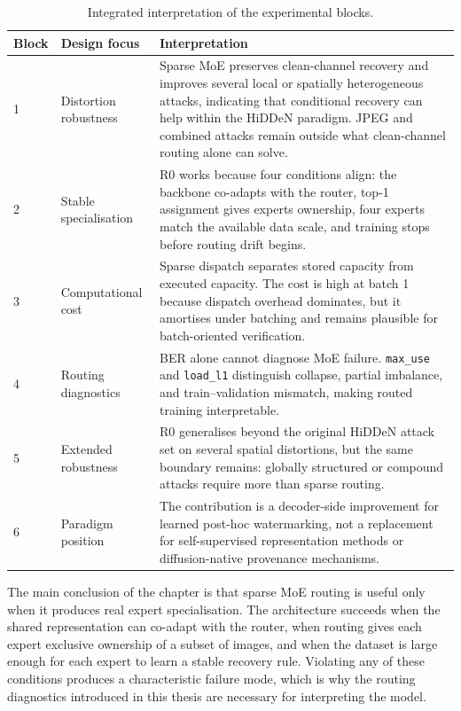 ﻿\documentclass[12pt, a4paper, twoside]{report}
\numberwithin{equation}{chapter}
\begin{document}
\begin{table}[H]
\centering
\begin{tabular}{p{0.6cm}p{3.5cm}p{8cm}}
\toprule
\textbf{Block} & \textbf{Design focus} & \textbf{Interpretation} \\
\midrule
1 & Distortion robustness & Sparse MoE preserves clean-channel recovery and improves several local or spatially heterogeneous attacks, indicating that conditional recovery can help within the HiDDeN paradigm. JPEG and combined attacks remain outside what clean-channel routing alone can solve. \\
2 & Stable specialisation & R0 works because four conditions align: the backbone co-adapts with the router, top-1 assignment gives experts ownership, four experts match the available data scale, and training stops before routing drift begins. \\
3 & Computational cost & Sparse dispatch separates stored capacity from executed capacity. The cost is high at batch 1 because dispatch overhead dominates, but it amortises under batching and remains plausible for batch-oriented verification. \\
4 & Routing diagnostics & BER alone cannot diagnose MoE failure. \texttt{max\_use} and \texttt{load\_l1} distinguish collapse, partial imbalance, and train--validation mismatch, making routed training interpretable. \\
5 & Extended robustness & R0 generalises beyond the original HiDDeN attack set on several spatial distortions, but the same boundary remains: globally structured or compound attacks require more than sparse routing. \\
6 & Paradigm position & The contribution is a decoder-side improvement for learned post-hoc watermarking, not a replacement for self-supervised representation methods or diffusion-native provenance mechanisms. \\
\bottomrule
\end{tabular}
\caption{Integrated interpretation of the experimental blocks.}
\label{tab:rq-summary}
\end{table}

The main conclusion of the chapter is that sparse MoE routing is useful only when it produces real expert specialisation. The architecture succeeds when the shared representation can co-adapt with the router, when routing gives each expert exclusive ownership of a subset of images, and when the dataset is large enough for each expert to learn a stable recovery rule. Violating any of these conditions produces a characteristic failure mode, which is why the routing diagnostics introduced in this thesis are necessary for interpreting the model.
\end{document}
